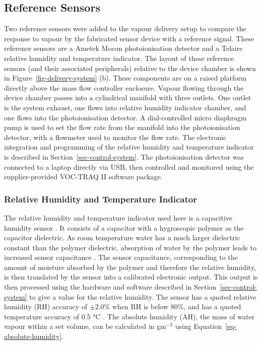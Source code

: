 \documentclass[
  a4paper,
]{scrbook}
\begin{document}
\hypertarget{sec-reference-sensors}{%
\subsection{Reference Sensors}\label{sec-reference-sensors}}

Two reference sensors were added to the vapour delivery setup to compare
the response to vapour by the fabricated sensor device with a reference
signal. These reference sensors are a Ametek Mocon photoionisation
detector and a Telaire relative humidity and temperature indicator. The
layout of these reference sensors (and their associated peripherals)
relative to the device chamber is shown in
Figure~\ref{fig-delivery-system} (b). These components are on a raised
platform directly above the mass flow controller enclosure. Vapour
flowing through the device chamber passes into a cylindrical manifold
with three outlets. One outlet is the system exhaust, one flows into
relative humidity indicator chamber, and one flows into the
photoionisation detector. A dial-controlled micro diaphragm pump is used
to set the flow rate from the manifold into the photoionisation
detector, with a flowmeter used to monitor the flow rate. The electronic
integration and programming of the relative humidity and temperature
indicator is described in Section~\ref{sec-control-system}. The
photoionisation detector was connected to a laptop directly via USB,
then controlled and monitored using the supplier-provided VOC-TRAQ II
software package.

\hypertarget{relative-humidity-and-temperature-indicator}{%
\subsubsection*{Relative Humidity and Temperature
Indicator}\label{relative-humidity-and-temperature-indicator}}

The relative humidity and temperature indicator used here is a
capacitive humidity sensor \autocite{Telairesensor}. It consists of a
capacitor with a hygroscopic polymer as the capacitor dielectric. As
room temperature water has a much larger dielectric constant than the
polymer dielectric, absorption of water by the polymer leads to
increased sensor capacitance \autocite{capacitivesensor}. The sensor
capacitance, corresponding to the amount of moisture absorbed by the
polymer and therefore the relative humidity, is then translated by the
sensor into a calibrated electronic output. This output is then
processed using the hardware and software described in
Section~\ref{sec-control-system} to give a value for the relative
humidity. The sensor has a quoted relative humidity (RH) accuracy of
\(\pm 2.0\)\% when RH is below 80\%, and has a quoted temperature
accuracy of 0.5 °C \autocite{Telairesensor}. The absolute humidity (AH),
the mass of water vapour within a set volume, can be calculated in
gm\(^{-3}\) using Equation~\ref{eq-absolute-humidity}.
\end{document}
